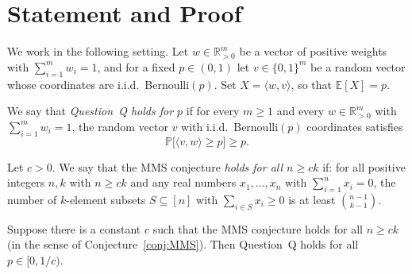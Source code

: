 \section{Statement and Proof}

We work in the following setting. Let $w\in\mathbb{R}_{>0}^m$ be a vector of positive weights with $\sum_{i=1}^m w_i=1$, and for a fixed $p\in(0,1)$ let $v\in\{0,1\}^m$ be a random vector whose coordinates are i.i.d.\ Bernoulli$(p)$. Set $X=\langle w,v\rangle$, so that $\mathbb{E}[X]=p$.

\begin{definition}
We say that \emph{Question~Q holds for $p$} if for every $m\ge 1$ and every $w\in\mathbb{R}_{>0}^m$ with $\sum_{i=1}^m w_i=1$, the random vector $v$ with i.i.d.\ Bernoulli$(p)$ coordinates satisfies
\[
\mathbb{P}\big[\langle v,w\rangle \ge p\big]\ge p.
\]
\end{definition}

\begin{conjecture}\label{conj:MMS}
Let $c>0$. We say that the MMS conjecture \emph{holds for all $n\ge ck$} if: for all positive integers $n,k$ with $n\ge ck$ and any real numbers $x_1,\dots,x_n$ with $\sum_{i=1}^n x_i=0$, the number of $k$-element subsets $S\subseteq[n]$ with $\sum_{i\in S}x_i\ge 0$ is at least $\binom{n-1}{k-1}$.
\end{conjecture}

\begin{theorem}\label{thm:main}
Suppose there is a constant $c$ such that the MMS conjecture holds for all $n\ge ck$ (in the sense of Conjecture~\ref{conj:MMS}). Then Question~Q holds for all $p\in[0,1/c)$.
\end{theorem}


